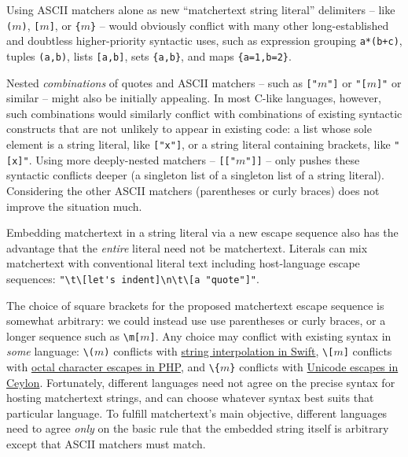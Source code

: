 Using ASCII matchers alone as new ``matchertext string literal'' delimiters --
like \verb|(|$m$\verb|)|, \verb|[|$m$\verb|]|, or \verb|{|$m$\verb|}| --
would obviously conflict with
many other long-established and doubtless higher-priority syntactic uses,
such as expression grouping \verb|a*(b+c)|, tuples \verb|(a,b)|,
lists \verb|[a,b]|, sets \verb|{a,b}|, and maps \verb|{a=1,b=2}|.

Nested \emph{combinations} of quotes and ASCII matchers --
such as \verb|["|$m$\verb|"]| or \verb|"[|$m$\verb|]"| or similar --
might also be initially appealing.
In most C-like languages, however,
such combinations would similarly conflict
with combinations of existing syntactic constructs
that are not unlikely to appear in existing code:
\eg a list whose sole element is a string literal, like \verb|["x"]|,
or a string literal containing brackets, like \verb|"[x]"|.
Using more deeply-nested matchers -- \eg \verb|[["|$m$\verb|"]]| --
only pushes these syntactic conflicts deeper
(a singleton list of a singleton list of a string literal).
Considering the other ASCII matchers (parentheses or curly braces)
does not improve the situation much.

Embedding matchertext in a string literal via a new escape sequence
also has the advantage that the \emph{entire} literal need not be matchertext.
Literals can mix matchertext with conventional literal text
including host-language escape sequences:
\eg \verb|"\t\[let's indent]\n\t\[a "quote"]"|.

The choice of square brackets for the proposed matchertext escape sequence
is somewhat arbitrary:
we could instead use use parentheses or curly braces,
or a longer sequence such as \verb|\m[|$m$\verb|]|.
Any choice may conflict with existing syntax in \emph{some} language:
\eg
\verb|\(|$m$\verb|)| conflicts with
\href{https://docs.swift.org/swift-book/LanguageGuide/StringsAndCharacters.html#ID292}{string interpolation in Swift},
\verb|\[|$m$\verb|]| conflicts with
\href{https://www.php.net/manual/en/language.types.string.php}{octal character escapes in PHP},
and
\verb|\{|$m$\verb|}| conflicts with
\href{https://ceylon-lang.org/documentation/1.3/reference/literal/string/}{Unicode escapes in Ceylon}.
Fortunately, different languages need not agree on
the precise syntax for hosting matchertext strings,
and can choose whatever syntax best suits that particular language.
To fulfill matchertext's main objective,
different languages need to agree \emph{only} on the basic rule
that the embedded string itself is arbitrary except that
ASCII matchers must match.



